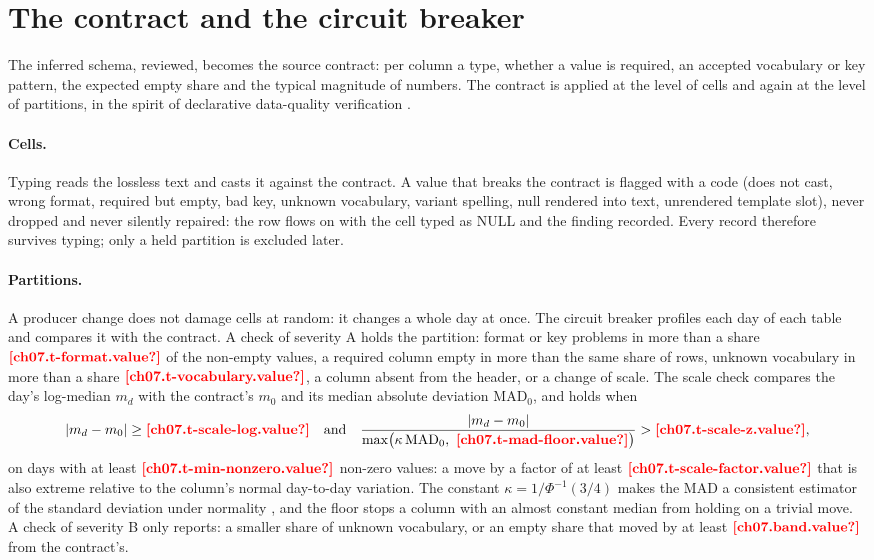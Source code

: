 

\section{The contract and the circuit breaker}\label{sec:sf-breaker}

The inferred schema, reviewed, becomes the source contract: per column a type, whether a value is required, an
accepted vocabulary or key pattern, the expected empty share and the typical magnitude of numbers. The contract is
applied at the level of cells and again at the level of partitions, in the spirit of declarative data-quality
verification \autocite{schelter2018}.

\paragraph{Cells.} Typing reads the lossless text and casts it against the contract. A value that breaks the contract is
flagged with a code (does not cast, wrong format, required but empty, bad key, unknown vocabulary, variant spelling,
null rendered into text, unrendered template slot), never dropped and never silently repaired: the row flows on with
the cell typed as NULL and the finding recorded. Every record therefore survives typing; only a held partition is
excluded later.

\paragraph{Partitions.} A producer change does not damage cells at random: it changes a whole day at once. The circuit
breaker profiles each day of each table and compares it with the contract. A check of severity A holds the partition:
format or key problems in more than a share $\est{ch07.t-format}{value}$ of the non-empty values, a required column
empty in more than the same share of rows, unknown vocabulary in more than a share $\est{ch07.t-vocabulary}{value}$, a
column absent from the header, or a change of scale. The scale check compares the day's log-median $m_d$ with the
contract's $m_0$ and its median absolute deviation $\mathrm{MAD}_0$, and holds when
\begin{equation}\label{eq:sf-scale}
  \lvert m_d - m_0 \rvert \ge \est{ch07.t-scale-log}{value}
  \quad\text{and}\quad
  \frac{\lvert m_d - m_0 \rvert}{\max\bigl(\kappa\,\mathrm{MAD}_0,\ \est{ch07.t-mad-floor}{value}\bigr)} > \est{ch07.t-scale-z}{value},
\end{equation}
on days with at least $\est{ch07.t-min-nonzero}{value}$ non-zero values: a move by a factor of at least
$\est{ch07.t-scale-factor}{value}$ that is also extreme relative to the column's normal day-to-day variation. The
constant $\kappa = 1/\Phi^{-1}(3/4)$ makes the MAD a consistent estimator of the standard deviation under normality
\autocite{rousseeuw1993}, and the floor stops a column with an almost constant median from holding on a trivial move.
A check of severity B only reports: a smaller share of unknown vocabulary, or an empty share that moved by at least
$\est{ch07.band}{value}$ from the contract's.

